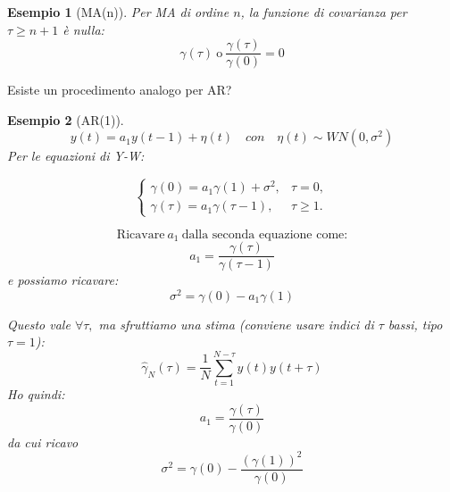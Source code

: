 \documentclass[11pt,a4paper]{article}
\newtheorem{example}{Esempio}
\begin{document}
\begin{example}[MA(n)]
    Per MA di ordine $n$, la funzione di covarianza per $\tau \geq n+1$ è nulla:
    \[
    \gamma(\tau) \ \text{o} \ \frac{\gamma(\tau)}{\gamma(0)} = 0
    \]
\end{example}

Esiste un procedimento analogo per AR?

\begin{example}[AR(1)]
\[
y(t)=a_1 y(t-1)+\eta(t) \quad con \quad \eta(t) \sim WN(0,\sigma^2)
\]
Per le equazioni di Y-W:

\[
\begin{cases}
\gamma(0) = a_1\gamma(1) + \sigma^2, & \tau = 0,\\
\gamma(\tau) = a_1\gamma(\tau - 1), & \tau\geq1.
\end{cases}
\]

\[
\text{Ricavare} \ a_1 \ \text{dalla seconda equazione come:}
\]
\[
a_1 = \frac{\gamma(\tau)}{\gamma(\tau -1)}
\]
e possiamo ricavare:
\[
\sigma^2 = \gamma(0) - a_1\gamma(1) 
\]

Questo vale $\forall\tau,$ ma sfruttiamo una stima (conviene usare indici di $\tau$ bassi, tipo $\tau = 1$):
\[
\hat \gamma_N(\tau) = \frac{1}{N}\sum_{t=1}^{N-\tau}y(t)y(t+\tau)
\]
Ho quindi:
\[
a_1 = \frac{\gamma(\tau)}{\gamma(0)} 
\]
da cui ricavo
\[
\sigma^2 = \gamma(0) - \frac{(\gamma(1))^2}{\gamma(0)}
\]
\end{example}
\end{document}
